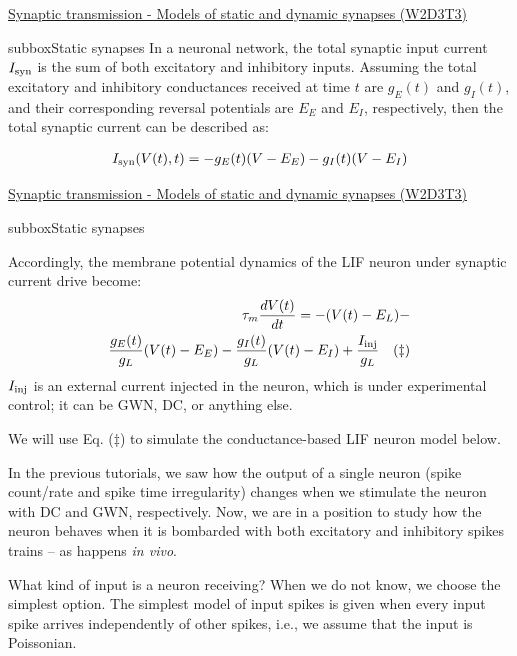 \begin{textbox}{\href{https://compneuro.neuromatch.io/tutorials/W2D3_BiologicalNeuronModels/student/W2D3_Tutorial3.html}{Synaptic transmission - Models of static and dynamic synapses (W2D3T3)} }
\begin{subbox}{subbox}{Static synapses}
In a neuronal network, the total synaptic input current $I_{\rm syn}$ is the sum of both excitatory and inhibitory inputs. Assuming the total excitatory and inhibitory conductances received at time $t$ are $g_E(t)$ and $g_I(t)$, and their corresponding reversal potentials are $E_E$ and $E_I$, respectively, then the total synaptic current can be described as: 

\begin{align}
I_{\rm syn}(V(t),t) = -g_E(t) (V-E_E) - g_I(t) (V-E_I)
\end{align}


\end{subbox}
\end{textbox}

\begin{textbox}{\href{https://compneuro.neuromatch.io/tutorials/W2D3_BiologicalNeuronModels/student/W2D3_Tutorial3.html}{Synaptic transmission - Models of static and dynamic synapses (W2D3T3)} }
\begin{subbox}{subbox}{Static synapses}
\scriptsize

Accordingly, the membrane potential dynamics of the LIF neuron under synaptic current drive become:
\begin{eqnarray*}
\tau_m\frac{dV(t)}{dt} = -(V(t)-E_L) -\\ \frac{g_E(t)}{g_L} (V(t)-E_E) - \frac{g_I(t)}{g_L} (V(t)-E_I) + \frac{I_{\rm inj}}{g_L}\quad (\ddagger)
\end{eqnarray*}
$I_{\rm inj}$ is an external current injected in the neuron, which is under experimental control; it can be GWN, DC, or anything else.

We will use Eq. ($\ddagger$) to simulate the conductance-based LIF neuron model below.

In the previous tutorials, we saw how the output of a single neuron (spike count/rate and spike time irregularity) changes when we stimulate the neuron with DC and GWN, respectively. Now, we are in a position to study how the neuron behaves when it is bombarded with both excitatory and inhibitory spikes trains -- as happens \textit{in vivo}.

What kind of input is a neuron receiving? When we do not know, we choose the simplest option. The simplest model of input spikes is given when every input spike arrives independently of other spikes, i.e., we assume that the input is Poissonian.

\end{subbox}



\end{textbox}
